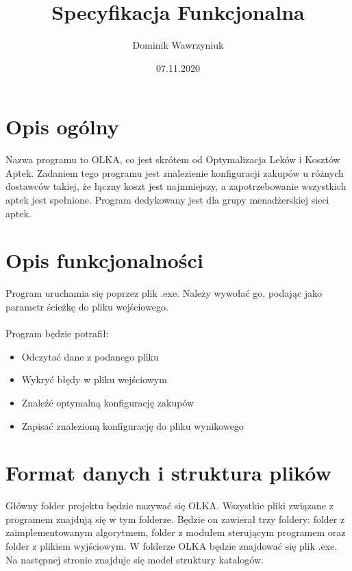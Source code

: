 \documentclass{article}
\title{Specyfikacja Funkcjonalna}
\date{07.11.2020}
\author{Dominik Wawrzyniuk}
\begin{document}
\maketitle

\section{Opis ogólny}

Nazwa programu to OLKA, co jest skrótem od Optymalizacja Leków i Kosztów Aptek. Zadaniem tego programu jest znalezienie konfiguracji zakupów u różnych dostawców takiej, że łączny koszt jest najmniejszy, a zapotrzebowanie wszystkich aptek jest spełnione. Program dedykowany jest dla grupy menadżerskiej sieci aptek.

\section{Opis funkcjonalności}

Program uruchamia się poprzez plik .exe. Należy wywołać go, podając jako parametr ścieżkę do pliku wejściowego.

\paragraph{}

Program będzie potrafił:

\begin{itemize}
	\item Odczytać dane z podanego pliku
	\item Wykryć błędy w pliku wejściowym
	\item Znaleźć optymalną konfigurację zakupów
	\item Zapisać znalezioną konfigurację do pliku wynikowego
\end{itemize}

\section{Format danych i struktura plików}

Główny folder projektu będzie nazywać się OLKA. 
Wszystkie pliki związane z programem znajdują się w tym folderze. Będzie on zawierał trzy foldery: folder z zaimplementowanym algorytmem, folder z modułem sterującym programem oraz folder z plikiem wyjściowym. W folderze OLKA będzie znajdować się plik .exe.
Na następnej stronie znajduje się model struktury katalogów.
\end{document}
